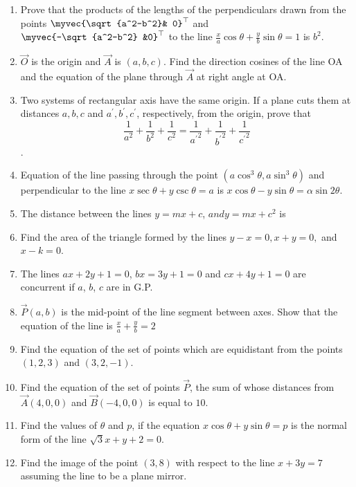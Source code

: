 \begin{enumerate}[label=\thesubsection.\arabic*, ref=\thesubsection.\theenumi]
\\
\solution
		
	\item Prove that the products of the lengths of the perpendiculars drawn from the points $\myvec{\sqrt{a^2-b^2}& 0}^{\top}$ and $\myvec{-\sqrt{a^2-b^2} &0}^{\top}$ to the line $\frac{x}{a} \cos{\theta} + \frac{y}{b}\sin{\theta} =1 $ is $ b^2 $.
\\
    \solution 
		
\item $\vec{O}$ is the origin and $\vec{A}$ is $(a, b, c)$. Find the direction cosines of the line OA and the equation of the plane through $\vec{A}$ at right angle at OA.
\item Two systems of rectangular axis have the same origin. If a plane cuts them at distances $a, b, c$ and $a^{\prime}, b^{\prime}, c^{\prime}$,  respectively,  from the origin,  prove that $$\frac{1}{a^2}+\frac{1}{b^2}+\frac{1}{c^2}=\frac{1}{{a^{\prime}}^2}+\frac{1}{{b^{\prime}}^2}+\frac{1}{{c^{\prime}}^2}$$.
\item Equation of the line passing through the point $(a\cos^3\theta,  a\sin^3\theta)$ and perpendicular to the line $x\sec\theta+y\csc\theta=a$ is $x\cos\theta-y\sin\theta=\alpha\sin2\theta$.
\item The distance between the lines $y=mx+c$, $ and $$y=mx+c^2$ is
	\item Find the area of the triangle formed by the lines $y-x=0,  x+y=0,  $ and $ x-k=0$.
		\\
\solution
		
\item The lines $ax+2y+1=0$,  $bx=3y+1=0$ and $cx+4y+1=0$ are concurrent if $a$,  $b$,  $c$ are in G.P.
\item 
$\vec{P}(a, b)$ is the mid-point of the line segment between axes. Show that the equation of the line is $\frac{x}{a}+\frac{y}{b}=2$
\label{chapters/11/10/2/18}
\\
\solution

\item Find the equation of the set of points which are equidistant from the points $(1, 2, 3)$ and $(3, 2, -1)$.
\item Find the equation of the set of points $\vec{P}$,  the sum of whose distances from $\vec{A}(4, 0, 0)$ and $\vec{B}(-4, 0, 0)$ is equal to $10$.
\item Find the values of $\theta$ and $p$,  if the equation $x \cos \theta + y \sin \theta = p$ is the normal form of the line $\sqrt 3x+y+2=0$.
\item Find the image of the point $(3, 8)$ with respect to the line $x+3y=7$ assuming the line to be a plane mirror.
$$
\end{enumerate}
